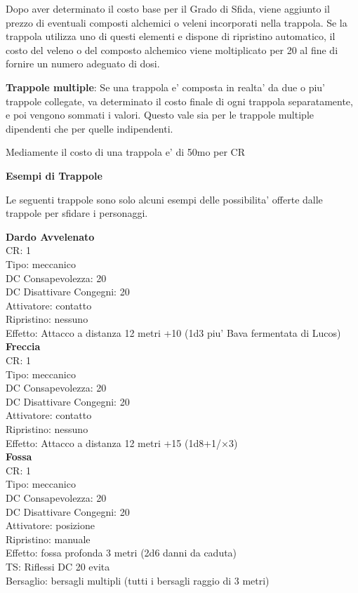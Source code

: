 \documentclass[a4paper,11pt,twoside,openany]{dndbook}
\begin{document}
{Dopo aver determinato il costo base per il Grado di Sfida, viene aggiunto il prezzo di eventuali composti alchemici o veleni incorporati nella trappola. Se la trappola utilizza uno di questi elementi e dispone di ripristino automatico, il costo del veleno o del composto alchemico viene moltiplicato per 20 al fine di fornire un numero adeguato di dosi.

\textbf{Trappole multiple}: Se una trappola e' composta in realta' da due o piu' trappole collegate, va determinato il costo finale di ogni trappola separatamente, e poi vengono sommati i valori. Questo vale sia per le trappole multiple dipendenti che per quelle indipendenti.

Mediamente il costo di una trappola e' di 50mo per CR

\pagebreak

\textbf{Esempi di Trappole}

Le seguenti trappole sono solo alcuni esempi delle possibilita' offerte
dalle trappole per sfidare i personaggi.

\begin{multicols}{2}
	
\textbf{Dardo Avvelenato}\\
CR: 1 \\
Tipo: meccanico \\
DC Consapevolezza: 20 \\
DC Disattivare Congegni: 20 \\
Attivatore: contatto \\
Ripristino: nessuno \\
Effetto: Attacco a distanza 12 metri +10 (1d3 piu' Bava fermentata di Lucos)\\

\textbf{Freccia}\\
CR: 1 \\
Tipo: meccanico \\
DC Consapevolezza: 20 \\
DC Disattivare Congegni: 20 \\
Attivatore: contatto \\
Ripristino: nessuno \\
Effetto: Attacco a distanza 12 metri +15 (1d8+1/×3)\\

\textbf{Fossa}\\
CR: 1 \\
Tipo: meccanico \\
DC Consapevolezza: 20 \\
DC Disattivare Congegni: 20 \\
Attivatore: posizione \\
Ripristino: manuale \\
Effetto: fossa profonda 3 metri (2d6 danni da caduta) \\
TS: Riflessi DC 20 evita \\
Bersaglio: bersagli multipli (tutti i bersagli raggio di 3 metri)\\


\end{multicols}}
\end{document}
